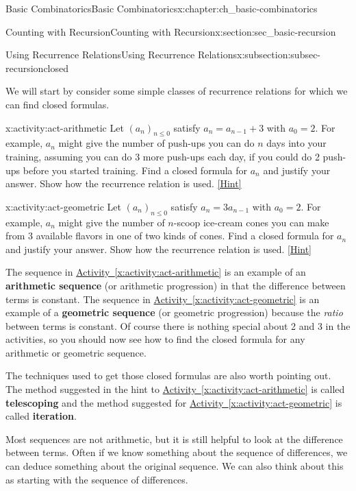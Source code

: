 \documentclass[oneside,10pt,]{book}
\newcommand{\terminology}[1]{\textbf{#1}}
\numberwithin{equation}{chapter}
\begin{document}
\begin{chapterptx}{Basic Combinatorics}{}{Basic Combinatorics}{}{}{x:chapter:ch_basic-combinatorics}
\begin{sectionptx}{Counting with Recursion}{}{Counting with Recursion}{}{}{x:section:sec_basic-recursion}
\begin{subsectionptx}{Using Recurrence Relations}{}{Using Recurrence Relations}{}{}{x:subsection:subsec-recursionclosed}
\par
We will start by consider some simple classes of recurrence relations for which we can find closed formulas.%
\begin{activity}{}{x:activity:act-arithmetic}%
Let \((a_n)_{n \le 0}\) satisfy \(a_n = a_{n-1} + 3\) with \(a_0 = 2\).  For example, \(a_n\) might give the number of push-ups you can do \(n\) days into your training, assuming you can do 3 more push-ups each day, if you could do 2 push-ups before you started training.  Find a closed formula for \(a_n\) and justify your answer.  Show how the recurrence relation is used.%
\space\hspace*{0pt}\hfill{\tiny\hyperlink{g:hint:idm2823-back}{[Hint]}}\end{activity}
\begin{activity}{}{x:activity:act-geometric}%
Let \((a_n)_{n \le 0}\) satisfy \(a_n = 3a_{n-1}\) with \(a_0 = 2\).  For example, \(a_n\) might give the number of \(n\)-scoop ice-cream cones you can make from 3 available flavors in one of two kinds of cones.  Find a closed formula for \(a_n\) and justify your answer.  Show how the recurrence relation is used.%
\space\hspace*{0pt}\hfill{\tiny\hyperlink{g:hint:idm2837-back}{[Hint]}}\end{activity}
The sequence in \hyperref[x:activity:act-arithmetic]{Activity~\ref{x:activity:act-arithmetic}} is an example of an \terminology{arithmetic sequence} (or arithmetic progression) in that the difference between terms is constant.  The sequence in \hyperref[x:activity:act-geometric]{Activity~\ref{x:activity:act-geometric}} is an example of a \terminology{geometric sequence} (or geometric progression) because the \emph{ratio} between terms is constant.  Of course there is nothing special about 2 and 3 in the activities, so you should now see how to find the closed formula for any arithmetic or geometric sequence.%
\par
The techniques used to get those closed formulas are also worth pointing out.  The method suggested in the hint to \hyperref[x:activity:act-arithmetic]{Activity~\ref{x:activity:act-arithmetic}} is called \terminology{telescoping} and the method suggested for \hyperref[x:activity:act-geometric]{Activity~\ref{x:activity:act-geometric}} is called \terminology{iteration}.%
\par
Most sequences are not arithmetic, but it is still helpful to look at the difference between terms.  Often if we know something about the sequence of differences, we can deduce something about the original sequence.   We can also think about this as starting with the sequence of differences.%

\end{subsectionptx}
\end{sectionptx}
\end{chapterptx}
\end{document}
